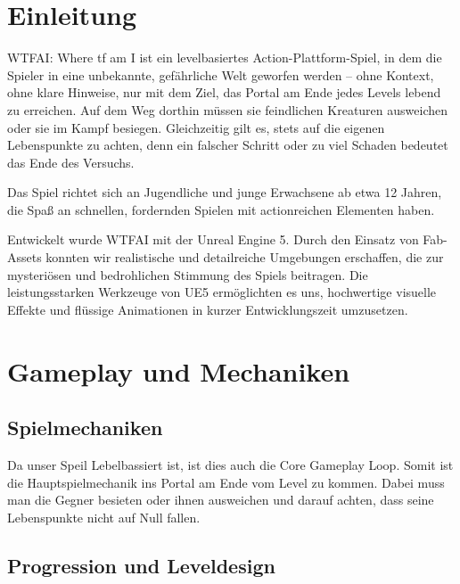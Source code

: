 \documentclass[oneside]{ausarbeitung}
\begin{document}


\cleardoublepage
{}
\setcounter{page}{1}

\chapter{Einleitung}
\label{cha:einleitung}

WTFAI: Where tf am I ist ein levelbasiertes Action-Plattform-Spiel, in dem die Spieler in eine unbekannte, gefährliche Welt geworfen werden – ohne Kontext, ohne klare Hinweise, nur mit dem Ziel, das Portal am Ende jedes Levels lebend zu erreichen. Auf dem Weg dorthin müssen sie feindlichen Kreaturen ausweichen oder sie im Kampf besiegen. Gleichzeitig gilt es, stets auf die eigenen Lebenspunkte zu achten, denn ein falscher Schritt oder zu viel Schaden bedeutet das Ende des Versuchs.

Das Spiel richtet sich an Jugendliche und junge Erwachsene ab etwa 12 Jahren, die Spaß an schnellen, fordernden Spielen mit actionreichen Elementen haben.

Entwickelt wurde WTFAI mit der Unreal Engine 5. Durch den Einsatz von Fab-Assets konnten wir realistische und detailreiche Umgebungen erschaffen, die zur mysteriösen und bedrohlichen Stimmung des Spiels beitragen. Die leistungsstarken Werkzeuge von UE5 ermöglichten es uns, hochwertige visuelle Effekte und flüssige Animationen in kurzer Entwicklungszeit umzusetzen.


\chapter{Gameplay und Mechaniken}
\label{cha:gameplayundmechaniken}

\section{Spielmechaniken}
\label{sec:spielmechaniken}

Da unser Speil Lebelbassiert ist, ist dies auch die Core Gameplay Loop. Somit ist die Hauptspielmechanik ins Portal am Ende vom Level zu kommen.
Dabei muss man die Gegner besieten oder ihnen ausweichen und darauf achten, dass seine Lebenspunkte nicht auf Null fallen. 


\section{Progression und Leveldesign}
\label{sec:progressionundleveldesign}
\end{document}
